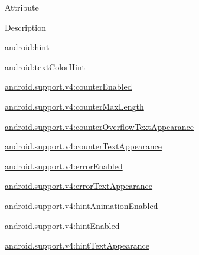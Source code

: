 Attribute

Description 

{\ttfamily \hyperlink{classandroid_1_1support_1_1v4_1_1R_1_1styleable_a0337fe9d70637bd62592e7b41ccd5850}{android\+:hint}}

{\ttfamily \hyperlink{classandroid_1_1support_1_1v4_1_1R_1_1styleable_a10cd7921092af5c7b2f2f95b6735bc64}{android\+:text\+Color\+Hint}}

{\ttfamily \hyperlink{classandroid_1_1support_1_1v4_1_1R_1_1styleable_aaf7513c377000dc3bef62cf4084e03c2}{android.\+support.\+v4\+:counter\+Enabled}}

{\ttfamily \hyperlink{classandroid_1_1support_1_1v4_1_1R_1_1styleable_a493f8299f04aee557c2fb4f3baaaea72}{android.\+support.\+v4\+:counter\+Max\+Length}}

{\ttfamily \hyperlink{classandroid_1_1support_1_1v4_1_1R_1_1styleable_a0d4416285c0952ef775840d271901791}{android.\+support.\+v4\+:counter\+Overflow\+Text\+Appearance}}

{\ttfamily \hyperlink{classandroid_1_1support_1_1v4_1_1R_1_1styleable_aeb2a80f0f76cdaa1ff3b2b05d42b6356}{android.\+support.\+v4\+:counter\+Text\+Appearance}}

{\ttfamily \hyperlink{classandroid_1_1support_1_1v4_1_1R_1_1styleable_a1524c63d3a980ad9efb17c1c648871c2}{android.\+support.\+v4\+:error\+Enabled}}

{\ttfamily \hyperlink{classandroid_1_1support_1_1v4_1_1R_1_1styleable_af9ca4eaf2eb93f555c4c269831af4712}{android.\+support.\+v4\+:error\+Text\+Appearance}}

{\ttfamily \hyperlink{classandroid_1_1support_1_1v4_1_1R_1_1styleable_a4c514fcd5878b74c6f2da4d89d933eef}{android.\+support.\+v4\+:hint\+Animation\+Enabled}}

{\ttfamily \hyperlink{classandroid_1_1support_1_1v4_1_1R_1_1styleable_a9b9008f58fe52182cb029310ed5338c2}{android.\+support.\+v4\+:hint\+Enabled}}

{\ttfamily \hyperlink{classandroid_1_1support_1_1v4_1_1R_1_1styleable_af051809dff99b96f096bb56e82505858}{android.\+support.\+v4\+:hint\+Text\+Appearance}}

